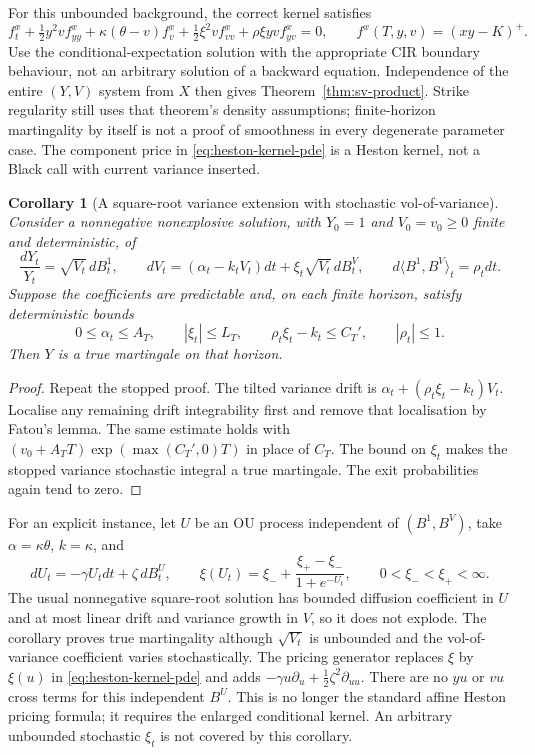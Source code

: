 \documentclass[11pt,a4paper]{article}
\numberwithin{equation}{section}
\newtheorem{corollary}[theorem]{Corollary}
\theoremstyle{definition}\newtheorem{definition}[theorem]{Definition}
\theoremstyle{remark}\newtheorem{remark}[theorem]{Remark}
\begin{document}
For this unbounded background, the correct kernel satisfies
\begin{equation}
 f_t^x+\tfrac12y^2v f_{yy}^x+\kappa(\theta-v)f_v^x
 +\tfrac12\xi^2v f_{vv}^x+\rho\xi yv f_{yv}^x=0,
 \qquad f^x(T,y,v)=(xy-K)^+.
 \label{eq:heston-kernel-pde}
\end{equation}
Use the conditional-expectation solution with the appropriate CIR boundary behaviour, not an arbitrary solution of a backward equation. Independence of the entire $(Y,V)$ system from $X$ then gives Theorem~\ref{thm:sv-product}. Strike regularity still uses that theorem's density assumptions; finite-horizon martingality by itself is not a proof of smoothness in every degenerate parameter case. The component price in \eqref{eq:heston-kernel-pde} is a Heston kernel, not a Black call with current variance inserted.

\begin{corollary}[A square-root variance extension with stochastic vol-of-variance]
\label{cor:random-xi}
Consider a nonnegative nonexplosive solution, with $Y_0=1$ and $V_0=v_0\geq0$ finite and deterministic, of
\[
 \frac{dY_t}{Y_t}=\sqrt{V_t}\,dB_t^1,\qquad
 dV_t=(\alpha_t-k_tV_t)dt+\xi_t\sqrt{V_t}\,dB_t^V,
 \qquad d\langle B^1,B^V\rangle_t=\rho_tdt.
\]
Suppose the coefficients are predictable and, on each finite horizon, satisfy deterministic bounds
\[
 0\leq\alpha_t\leq A_T,
 \qquad |\xi_t|\leq L_T,
 \qquad \rho_t\xi_t-k_t\leq C_T',
 \qquad |\rho_t|\leq1.
\]
Then $Y$ is a true martingale on that horizon.
\end{corollary}
\begin{proof}
Repeat the stopped proof. The tilted variance drift is
$\alpha_t+(\rho_t\xi_t-k_t)V_t$. Localise any remaining drift integrability first and remove that localisation by Fatou's lemma. The same estimate holds with
$(v_0+A_TT)\exp(\max(C_T',0)T)$ in place of $C_T$. The bound on $\xi_t$ makes the stopped variance stochastic integral a true martingale. The exit probabilities again tend to zero.
\end{proof}
For an explicit instance, let $U$ be an OU process independent of $(B^1,B^V)$, take $\alpha=\kappa\theta$, $k=\kappa$, and
\[
 dU_t=-\gamma U_tdt+\zeta\,dB_t^U,
 \qquad \xi(U_t)=\xi_-+\frac{\xi_+-\xi_-}{1+e^{-U_t}},
 \qquad 0<\xi_-<\xi_+<\infty.
\]
The usual nonnegative square-root solution has bounded diffusion coefficient in $U$ and at most linear drift and variance growth in $V$, so it does not explode. The corollary proves true martingality although $\sqrt{V_t}$ is unbounded and the vol-of-variance coefficient varies stochastically. The pricing generator replaces $\xi$ by $\xi(u)$ in \eqref{eq:heston-kernel-pde} and adds
$-\gamma u\partial_u+\tfrac12\zeta^2\partial_{uu}$. There are no $yu$ or $vu$ cross terms for this independent $B^U$. This is no longer the standard affine Heston pricing formula; it requires the enlarged conditional kernel. An arbitrary unbounded stochastic $\xi_t$ is not covered by this corollary.
\end{document}
